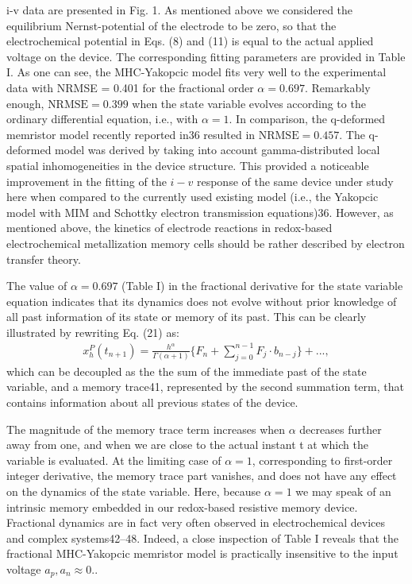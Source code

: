 \documentclass[10pt]{article}
\begin{document}
\begin{multicols}{2}
{i-v data are presented in Fig. 1. As mentioned above
we considered the equilibrium Nernst-potential of the
electrode to be zero, so that the electrochemical potential in Eqs. (8) and (11) is equal to the actual applied
voltage on the device. The corresponding fitting parameters are provided in Table I. As one can see, the
MHC-Yakopcic model fits very well to the experimental data with NRMSE = 0.401 for the fractional order
$\alpha = 0.697$. Remarkably enough, $\text{NRMSE} = 0.399$ when
the state variable evolves according to the ordinary differential equation, i.e., with $\alpha = 1$. In comparison, the
q-deformed memristor model recently reported in36 resulted in $\text{NRMSE} = 0.457$. The q-deformed model was
derived by taking into account gamma-distributed local
spatial inhomogeneities in the device structure. This provided a noticeable improvement in the fitting of the $i-v$ response of the same device under study here when
compared to the currently used existing model (i.e., the
Yakopcic model with MIM and Schottky electron transmission equations)36. However, as mentioned above,
the kinetics of electrode reactions in redox-based electrochemical metallization memory cells should be rather described by electron transfer theory. \par
The value of $\alpha = 0.697$ (Table I) in the fractional
derivative for the state variable equation indicates that
its dynamics does not evolve without prior knowledge of
all past information of its state or memory of its past.
This can be clearly illustrated by rewriting Eq. (21) as:
\begin{align}
   x_h^P (t_{n+1}) = \frac{h^\alpha}{\Gamma (\alpha + 1)} \biggl\{ F_n + \sum_{j=0}^{n-1} F_j \cdot b_{n-j} \biggr\} + ...,
\end{align}
which can be decoupled as the the sum of the immediate past of the state variable, and a memory trace41, represented by the second summation term, that contains information about all previous states of the device. \par
The magnitude of the memory trace term increases when $\alpha$ decreases further away from one, and when we are close to the actual instant t at which the variable is evaluated. At the limiting case of $\alpha = 1$, corresponding
to first-order integer derivative, the memory trace part
vanishes, and does not have any effect on the dynamics of
the state variable. Here, because $\alpha = 1$ we may speak of
an intrinsic memory embedded in our redox-based resistive memory device. Fractional dynamics are in fact very often observed in electrochemical devices and complex systems42–48. Indeed, a close inspection of Table I reveals that the fractional MHC-Yakopcic memristor model is practically insensitive to the input voltage $a_p, a_n \approx 0.$.
{\centering %
}}
\end{multicols}
\end{document}
